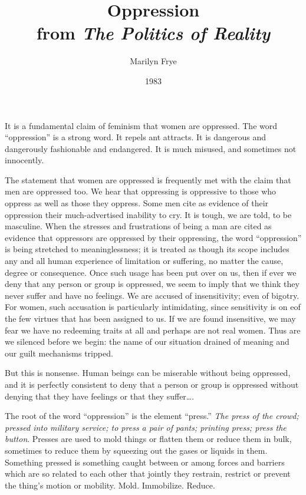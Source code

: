 \documentclass{article}
\title{Oppression\\from \emph{The Politics of Reality}}
\author{Marilyn Frye}
\date{1983}
\begin{document}
\maketitle

It is a fundamental claim of feminism that women are oppressed. The word
``oppression'' is a strong word. It repels ant attracts. It is dangerous and
dangerously fashionable and endangered. It is much misused, and sometimes not
innocently.

The statement that women are oppressed is frequently met with the claim that
men are oppressed too. We hear that oppressing is oppressive to those who
oppress as well as those they oppress. Some men cite as evidence of their
oppression their much-advertised inability to cry. It is tough, we are told, to
be masculine. When the stresses and frustrations of being a man are cited as
evidence that oppressors are oppressed by their oppressing, the word
``oppression'' is being stretched to meaninglessness; it is treated as though
its scope includes any and all human experience of limitation or suffering, no
matter the cause, degree or consequence. Once such usage has been put over on
us, then if ever we deny that any person or group is oppressed, we seem to
imply that we think they never suffer and have no feelings. We are accused of
insensitivity; even of bigotry. For women, such accusation is particularly
intimidating, since sensitivity is on eof the few virtues that has been
assigned to us. If we are found insensitive, we may fear we have no redeeming
traits at all and perhaps are not real women. Thus are we silenced before we
begin: the name of our situation drained of meaning and our guilt mechanisms
tripped.

But this is nonsense. Human beings can be miserable without being oppressed,
and it is perfectly consistent to deny that a person or group is oppressed
without denying that they have feelings or that they suffer\ldots{}.

The root of the word ``oppression'' is the element ``press.'' \emph{The press
of the crowd; pressed into military service; to press a pair of pants; printing
press; press the button}. Presses are used to mold things or flatten them or
reduce them in bulk, sometimes to reduce them by squeezing out the gases or
liquids in them. Something pressed is something caught between or among forces
and barriers which are so related to each other that jointly they restrain,
restrict or prevent the thing's motion or mobility. Mold. Immobilize. Reduce.
\end{document}
